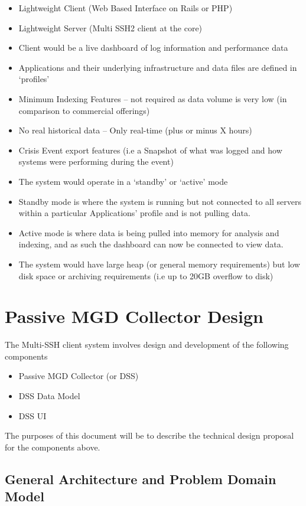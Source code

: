 \documentclass{llncs}
\begin{document}
\begin{itemize}
\item Lightweight Client (Web Based Interface on Rails or PHP)
\item 	Lightweight Server (Multi SSH2 client at the core)
\item 	Client would be a live dashboard of log information and performance data
\item 	Applications and their underlying infrastructure and data files are defined in ‘profiles’
\item 	Minimum Indexing Features – not required as data volume is very low (in comparison to commercial offerings)
\item 	No real historical data – Only real-time (plus or minus X hours)
\item 	Crisis Event export features (i.e a Snapshot of what was logged and how systems were performing during the event)
\item 	The system would operate in a ‘standby’ or ‘active’ mode
\item 	Standby mode is where the system is running but not connected to all servers within a particular Applications’ profile and is not pulling data.
\item 	Active mode is where data is being pulled into memory for analysis and indexing, and as such the dashboard can now be connected to view data.
\item 	The system would have large heap (or general memory requirements) but low disk space or archiving requirements (i.e up to 20GB overflow to disk)
\end{itemize}
\newpage
\section{Passive MGD Collector Design}

The Multi-SSH client system involves design and development of the following components
\begin{itemize}
\item Passive MGD Collector (or DSS)
\item	DSS Data Model
\item	DSS UI
\end{itemize}

The purposes of this document will be to describe the technical design proposal for the components above.

\subsection{General Architecture and Problem Domain Model}
\end{document}
